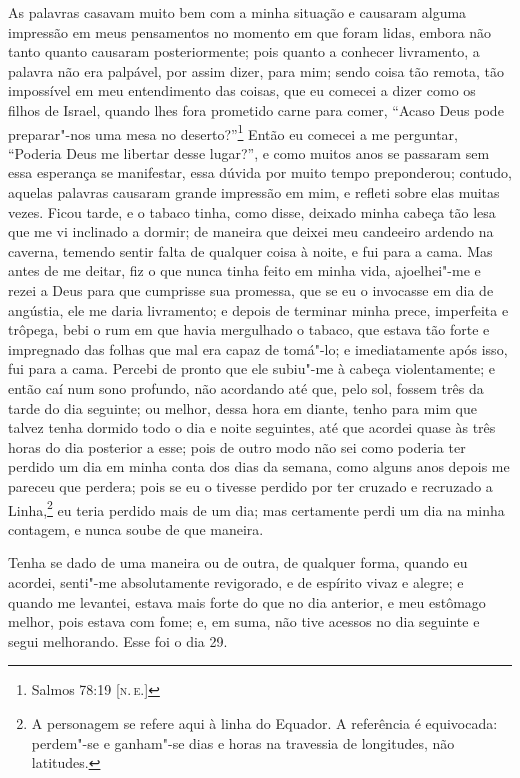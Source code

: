 As palavras casavam muito bem com a minha situação e causaram alguma
impressão em meus pensamentos no momento em que foram lidas, embora não
tanto quanto causaram posteriormente; pois quanto a conhecer livramento,
a palavra não era palpável, por assim dizer, para mim; sendo coisa tão
remota, tão impossível em meu entendimento das coisas, que eu comecei a
dizer como os filhos de Israel, quando lhes fora prometido carne para
comer, ``Acaso Deus pode preparar"-nos uma mesa no deserto?''\footnote{Salmos
  78:19 {[}\textsc{n.\,e.}{]}} Então eu comecei a me perguntar, ``Poderia Deus me
libertar desse lugar?'', e como muitos anos se passaram sem essa
esperança se manifestar, essa dúvida por muito tempo preponderou;
contudo, aquelas palavras causaram grande impressão em mim, e refleti
sobre elas muitas vezes. Ficou tarde, e o tabaco tinha, como disse,
deixado minha cabeça tão lesa que me vi inclinado a dormir; de maneira
que deixei meu candeeiro ardendo na caverna, temendo sentir falta de
qualquer coisa à noite, e fui para a cama. Mas antes de me deitar, fiz o
que nunca tinha feito em minha vida, ajoelhei"-me e rezei a Deus para que
cumprisse sua promessa, que se eu o invocasse em dia de angústia, ele me
daria livramento; e depois de terminar minha prece, imperfeita e
trôpega, bebi o rum em que havia mergulhado o tabaco, que estava tão
forte e impregnado das folhas que mal era capaz de tomá"-lo; e
imediatamente após isso, fui para a cama. Percebi de pronto que ele
subiu"-me à cabeça violentamente; e então caí num sono profundo, não
acordando até que, pelo sol, fossem três da tarde do dia seguinte; ou
melhor, dessa hora em diante, tenho para mim que talvez tenha dormido
todo o dia e noite seguintes, até que acordei quase às três horas do dia
posterior a esse; pois de outro modo não sei como poderia ter perdido um
dia em minha conta dos dias da semana, como alguns anos depois me
pareceu que perdera; pois se eu o tivesse perdido por ter cruzado e
recruzado a Linha,\footnote{A personagem se refere aqui à linha do
  Equador. A referência é equivocada: perdem"-se e ganham"-se dias e horas
  na travessia de longitudes, não latitudes.} eu teria perdido mais de
um dia; mas certamente perdi um dia na minha contagem, e nunca soube de
que maneira.

Tenha se dado de uma maneira ou de outra, de qualquer forma, quando eu
acordei, senti"-me absolutamente revigorado, e de espírito vivaz e
alegre; e quando me levantei, estava mais forte do que no dia anterior,
e meu estômago melhor, pois estava com fome; e, em suma, não tive
acessos no dia seguinte e segui melhorando. Esse foi o dia 29.

